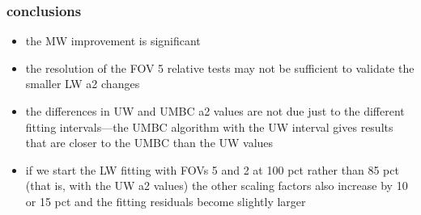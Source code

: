 \documentclass[11pt]{beamer}
\begin{document}
\begin{frame}
\frametitle{conclusions}

\begin{itemize}

  \item the MW improvement is significant

  \item the resolution of the FOV 5 relative tests may not be
    sufficient to validate the smaller LW a2 changes

  \item the differences in UW and UMBC a2 values are not due just to
    the different fitting intervals---the UMBC algorithm with the UW
    interval gives results that are closer to the UMBC than the UW
    values

  \item if we start the LW fitting with FOVs 5 and 2 at 100 pct
    rather than 85 pct (that is, with the UW a2 values) the other
    scaling factors also increase by 10 or 15 pct and the fitting
    residuals become slightly larger

\end{itemize}

\end{frame}
% 
% 
% 
\end{document}
